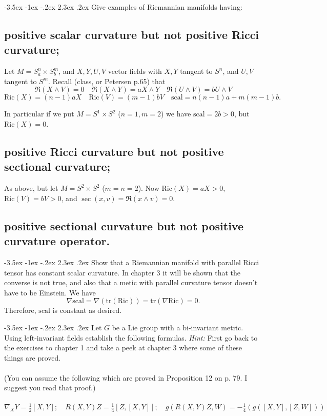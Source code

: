 \documentclass[10pt]{article}
\makeatletter
\renewcommand\section{\@startsection{section}{1}{\z@}%
                                  {-3.5ex \@plus -1ex \@minus -.2ex}%
                                  {2.3ex \@plus.2ex}%
                                  {\normalfont\large\bfseries}}
\newcommand{\ric}{\mbox{Ric}}
\newcommand{\scal}{\mbox{scal}}
\newcommand{\tr}{\mbox{tr}}
\newcommand{\hint}[1]{{\emph{Hint:} #1}} %
\makeatother
\begin{document}

\section{Give examples of Riemannian manifolds having:}
\subsection{positive scalar curvature but not positive Ricci curvature;}

Let $M = S^n_a \times S_b^m$, and $X,Y, U,V$ vector fields with $X,Y$ tangent to $S^n$, and $U,V$ tangent to $S^m$. 
Recall (class, or Petersen p.65) that
\[\mathfrak{R} (X \wedge V) = 0 \quad \mathfrak{R} (X \wedge Y) = a X \wedge Y \quad \mathfrak{R} (U \wedge V) = b U \wedge V \]
\[\ric (X) = (n-1) a X \quad \ric(V) = (m-1) bV \quad \scal = n(n-1) a + m(m-1) b.\]

In particular if we put $M = S^1 \times S^2$ ($n=1 , m=2$) we have $\scal = 2b > 0$, but $\ric(X) = 0$.

\subsection{positive Ricci curvature but not positive sectional curvature;}

As above, but let $M = S^2 \times S^2$ ($m=n=2$). Now $\ric(X) = a X > 0$, $\ric(V) = b V > 0 $, and $\sec(x,v) = \mathfrak{R}(x \wedge v) = 0$.

\subsection{positive sectional curvature but not positive curvature operator.}

\section{Show that a Riemannian manifold with parallel Ricci tensor has constant scalar curvature.
In chapter 3 it will be shown that the converse is not true, and also that a metic with parallel curvature tensor doesn't have to be Einstein.}
We have 
\[\nabla \scal = \nabla (\tr (\ric))  = \tr ( \nabla \ric ) = 0.\]
Therefore, $\scal$ is constant as desired.

\section{Let $G$ be a Lie group with a bi-invariant metric. Using 
left-invariant fields establish the following formulas. \hint{First go back to the exercises to chapter 1 and take a peek at chapter 3 where some of these things   are proved.} \\ \\ (You can assume the following which are proved in Proposition 12 on p. 79. I suggest you read that proof.) \\ \\ $\nabla_X Y = \frac{1}{2} [X,Y]; \quad R(X,Y)Z = \frac{1}{4}[Z,[X,Y]]; \quad g(R(X,Y)Z,W) = - \frac{1}{4} (g([X,Y],[Z,W]))$}
\end{document}
